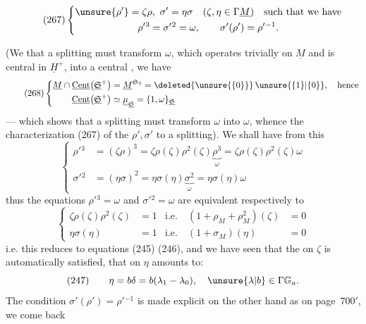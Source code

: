 
\[
\tag{267}
\left\{
\begin{gathered}
\unsure{\rho'}=\zeta\rho,\ \sigma'=\eta\sigma
\quad(\zeta,\eta\in\Gamma\underline M)\quad\text{such that we have}
\\
\rho'{}^3=\sigma'{}^2=\omega,\qquad
\sigma'(\rho')=\rho'{}^{-1}.
\end{gathered}\right.
\]

(We  that a splitting must transform $\omega$,
which operates trivially on $\underline M$ and is central
in $\underline H^+$, into a central 
, 
   we have
\[
\tag{268}
\left\{\begin{aligned}
\underline M\cap\underline{\mathrm{Cent}}\bigl(\underline{\mathfrak S}^+\bigr)
&=\underline M^{\mathfrak S_3}
=\deleted{\unsure{\{0\}}}\,\unsure{\{1\}|\{0\}},\quad\text{hence}
\\
\underline{\mathrm{Cent}}\bigl(\underline{\mathfrak S}^+\bigr)
&\simeq\underline\mu_{\underline{\mathfrak S}}
=\{1,\omega\}_{\underline{\mathfrak S}}
\end{aligned}\right.
\]
--- which shows that a splitting must transform $\omega$ into $\omega$,
whence  the characterization (267) of the $\rho',\sigma'$
 to a splitting).
We shall have from this
\[
\left\{\begin{aligned}
\rho'{}^3&=(\zeta\rho)^3
=\zeta\rho(\zeta)\rho^2(\zeta)\underbrace{\rho^3}_{\omega}
=\zeta\rho(\zeta)\rho^2(\zeta)\omega
\\
\sigma'{}^2&=(\eta\sigma)^2
=\eta\sigma(\eta)\underbrace{\sigma^2}_{\omega}
=\eta\sigma(\eta)\omega
\end{aligned}\right.
\]
thus the  equations $\rho'{}^3=\omega$ and
$\sigma'{}^2=\omega$ are equivalent respectively to
\[
\left\{\begin{aligned}
\zeta\rho(\zeta)\rho^2(\zeta)&=1
&\text{i.e.}\quad(1+\rho_M+\rho_M^2)(\zeta)&=0
\\
\eta\sigma(\eta)&=1
&\text{i.e.}\quad(1+\sigma_M)(\eta)&=0
\end{aligned}\right.
\]
i.e. this reduces to equations (245) (246),
and we have seen that the 
on $\zeta$ is automatically satisfied, that
on $\eta$ amounts to:
\[
(247)\qquad
\eta=b\delta=b(\lambda_1-\lambda_0),\quad
\unsure{\lambda|b}\in\Gamma\mathbb G_a.
\]
The condition $\sigma'(\rho')=\rho'{}^{-1}$ is made explicit on the other
hand as on page~$700'$, we come back


